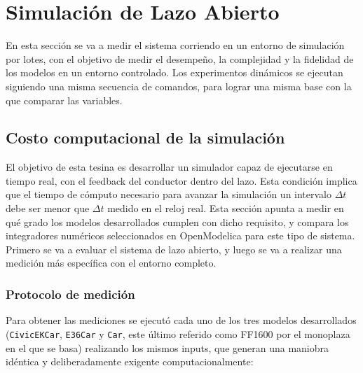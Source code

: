 \section{Simulación de Lazo Abierto}

En esta sección se va a medir el sistema corriendo en un entorno de simulación por lotes, con el objetivo de medir el desempeño, la complejidad y la fidelidad de los modelos en un entorno controlado. Los experimentos dinámicos se ejecutan siguiendo una misma secuencia de comandos, para lograr una misma base con la que comparar las variables.


\subsection{Costo computacional de la simulación}

El objetivo de esta tesina es desarrollar un simulador capaz de ejecutarse en tiempo real, con el feedback del conductor dentro del lazo. Esta condición implica que el tiempo de cómputo necesario para avanzar la simulación un intervalo $\Delta t$ debe ser menor que $\Delta t$ medido en el reloj real. Esta sección apunta a medir en qué grado los modelos desarrollados cumplen con dicho requisito, y compara los integradores numéricos seleccionados en OpenModelica para este tipo de sistema. Primero se va a evaluar el sistema de lazo abierto, y luego se va a realizar una medición más específica con el entorno completo.


\subsubsection{Protocolo de medición}

Para obtener las mediciones se ejecutó cada uno de los tres modelos desarrollados (\verb|CivicEKCar|, \verb|E36Car| y \verb|Car|, este último referido como FF1600 por el monoplaza en el que se basa) realizando los mismos inputs, que generan una maniobra idéntica y deliberadamente exigente computacionalmente:

